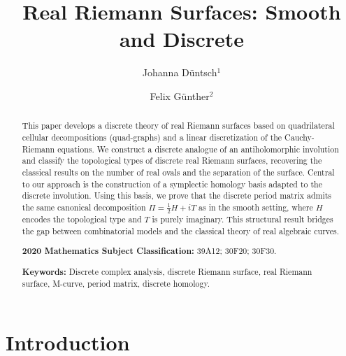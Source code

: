 \documentclass[11pt,a4paper]{article}
\theoremstyle{definition}
\begin{document}
\title{Real Riemann Surfaces: Smooth and Discrete}

\author{Johanna D\"untsch$^{1}$ \and Felix G\"unther$^{2}$}


\maketitle
\setlength{\parindent}{0em}

\begin{abstract}
	\noindent
	This paper develops a discrete theory of real Riemann surfaces based on quadrilateral cellular decompositions (quad-graphs) and a linear discretization of the Cauchy-Riemann equations. We construct a discrete analogue of an antiholomorphic involution and classify the topological types of discrete real Riemann surfaces, recovering the classical results on the number of real ovals and the separation of the surface. 
	Central to our approach is the construction of a symplectic homology basis adapted to the discrete involution. Using this basis, we prove that the discrete period matrix admits the same canonical decomposition $\Pi = \frac{1}{2} H + i T$ as in the smooth setting, where $H$ encodes the topological type and $T$ is purely imaginary. This structural result bridges the gap between combinatorial models and the classical theory of real algebraic curves.
	\\ \vspace{0.5ex}
	
	\noindent
	\textbf{2020 Mathematics Subject Classification:} 39A12; 30F20; 30F30.\\ \vspace{0.5ex}
	
	\noindent
	\textbf{Keywords:} Discrete complex analysis, discrete Riemann surface, real Riemann surface, M-curve, period matrix, discrete homology.
\end{abstract}
		
\raggedbottom
\setlength{\parindent}{0pt}
\setlength{\parskip}{1ex}

\section{Introduction}\label{sec:intro}
\end{document}
